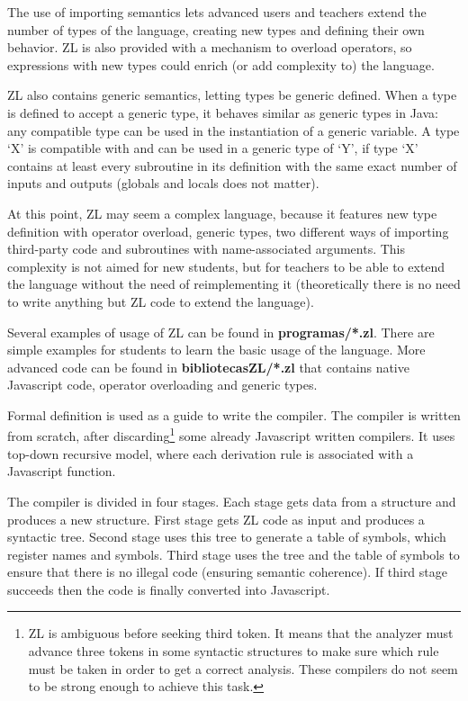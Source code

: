 \documentclass{report}
\begin{document}
	The use of importing semantics lets advanced users and teachers extend the number of types of the language, creating new types and defining their own behavior. ZL is also provided with a mechanism to overload operators, so expressions with new types could enrich (or add complexity to) the language. 
	
	ZL also contains generic semantics, letting types be generic defined. When a type is defined to accept a generic type, it behaves similar as generic types in Java: any compatible type can be used in the instantiation of a generic variable. A type `X' is compatible with and can be used in a generic type of `Y', if type `X' contains at least every subroutine in its definition with the same exact number of inputs and outputs (globals and locals does not matter).  
	
	At this point, ZL may seem a complex language, because it features new type definition with operator overload, generic types, two different ways of importing third-party code and subroutines with name-associated arguments. This complexity is not aimed for new students, but for teachers to be able to extend the language without the need of reimplementing it (theoretically there is no need to write anything but ZL code to extend the language). 

	Several examples of usage of ZL can be found in \textbf{programas/*.zl}. There are simple examples for students to learn the basic usage of the language. More advanced code can be found in \textbf{bibliotecasZL/*.zl} that contains native Javascript code, operator overloading and generic types. 
	
	Formal definition is used as a guide to write the compiler. The compiler is written from scratch, after discarding\footnote{ZL is ambiguous before seeking third token. It means that the analyzer must advance three tokens in some syntactic structures to make sure which rule must be taken in order to get a correct analysis. These compilers do not seem to be strong enough to achieve this task.} some already Javascript written compilers. It uses top-down recursive model, where each derivation rule is associated with a Javascript function. 
	
	The compiler is divided in four stages. Each stage gets data from a structure and produces a new structure. First stage gets ZL code as input and produces a syntactic tree. Second stage uses this tree to generate a table of symbols, which register names and symbols. Third stage uses the tree and the table of symbols to ensure that there is no illegal code (ensuring semantic coherence). If third stage succeeds then the code is finally converted into Javascript.
	
\end{document}
